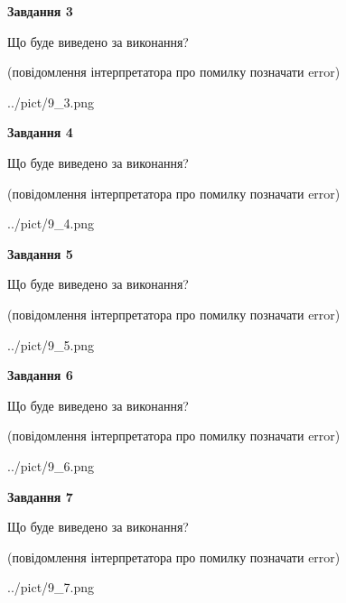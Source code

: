 \documentclass[12pt, ukrainian]{article}
\begin{document}
{\begin {large}
{\begin {center}\textbf{Завдання 3}\end {center}}\par
Що буде виведено за виконання?\par
 (повідомлення інтерпретатора про помилку позначати error)\par
\begin{center}
	{../pict/9_3.png}
\end{center}
\newpage

{\begin {center}\textbf{Завдання 4}\end {center}}\par
Що буде виведено за виконання?\par
 (повідомлення інтерпретатора про помилку позначати error)\par
\begin{center}
	{../pict/9_4.png}
\end{center}
\newpage

{\begin {center}\textbf{Завдання 5}\end {center}}\par
Що буде виведено за виконання?\par
 (повідомлення інтерпретатора про помилку позначати error)\par
\begin{center}
	{../pict/9_5.png}
\end{center}
\newpage

{\begin {center}\textbf{Завдання 6}\end {center}}\par
Що буде виведено за виконання?\par
 (повідомлення інтерпретатора про помилку позначати error)\par
\begin{center}
	{../pict/9_6.png}
\end{center}
\newpage

{\begin {center}\textbf{Завдання 7}\end {center}}\par
Що буде виведено за виконання?\par
 (повідомлення інтерпретатора про помилку позначати error)\par
\begin{center}
	{../pict/9_7.png}
\end{center}
\newpage


\end{large}}
\end{document}
